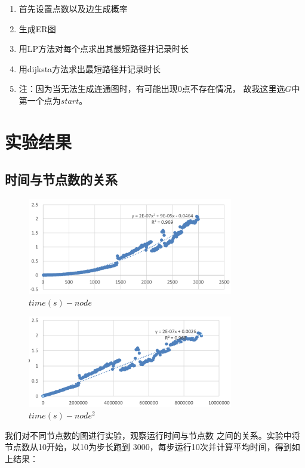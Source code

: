 \documentclass[10pt,a4paper,oneside]{article}
\begin{document}
\begin{enumerate}
    \item 首先设置点数以及边生成概率
    \item 生成ER图
    \item 用LP方法对每个点求出其最短路径并记录时长
    \item 用dijksta方法求出最短路径并记录时长
    \item 注：因为当无法生成连通图时，有可能出现0点不存在情况，
    故我这里选$G$中第一个点为$start$。
\end{enumerate}

\section{实验结果}

\subsection{时间与节点数的关系}

\begin{figure}[H]
    \centering
    \includegraphics[width=0.8\textwidth]{屏幕截图 2024-11-05 100309.png}
    \caption{$time(s)-node$}
\end{figure}

\begin{figure}[H]
    \centering
    \includegraphics[width=0.8\textwidth]{屏幕截图 2024-11-05 100835.png}
    \caption{$time(s)-node^2$}
\end{figure}

我们对不同节点数的图进行实验，观察运行时间与节点数
之间的关系。实验中将节点数从10开始，以10为步长跑到
3000，每步运行10次并计算平均时间，得到如上结果：
\end{document}
